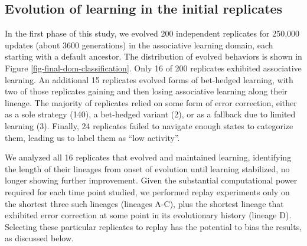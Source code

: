 \subsection{Evolution of learning in the initial replicates}
In the first phase of this study, we evolved 200 independent replicates for 250,000 updates (about 3600 generations) in the associative learning domain, each starting with a default ancestor.%
The distribution of evolved behaviors is shown in Figure \ref{fig-final-dom-classification}.
Only 16 of 200 replicates exhibited associative learning.
An additional 15 replicates evolved forms of bet-hedged learning, with two of those replicates gaining and then losing associative learning along their lineage.
The majority of replicates relied on some form of error correction, either as a sole strategy (140), a bet-hedged variant (2), or as a fallback due to limited learning (3). 
Finally, 24 replicates failed to navigate enough states to categorize them, leading us to label them as ``low activity''. 

We analyzed all 16 replicates that evolved and maintained learning, identifying the length of their lineages from onset of evolution until learning stabilized, no longer showing further improvement.
Given the substantial computational power required for each time point studied, we performed replay experiments only on the shortest three such lineages (lineages A-C), plus the shortest lineage that exhibited error correction at some point in its evolutionary history (lineage D).
Selecting these particular replicates to replay has the potential to bias the results, as discussed below.

